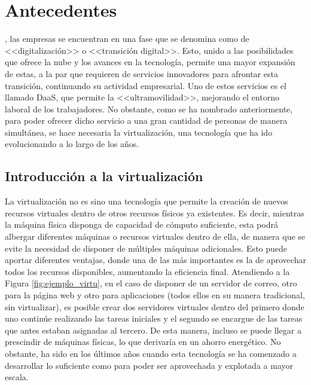 \chapter{Antecedentes}
\label{chap:antecedentes}

, las empresas se encuentran en una fase que se denomina como de <<digitalización>> o <<transición digital>>. Esto, unido a las posibilidades que ofrece la nube y los avances en la tecnología, permite una mayor expansión de estas, a la par que requieren de servicios innovadores para afrontar esta transición, continuando su actividad empresarial. Uno de estos servicios es el llamado \acf{DaaS}, que permite la <<ultramovilidad>>, mejorando el entorno laboral de los trabajadores. No obstante, como se ha nombrado anteriormente, para poder ofrecer dicho servicio a una gran cantidad de personas de manera simultánea, se hace necesaria la virtualización, una tecnología que ha ido evolucionando a lo largo de los años.


\section{Introducción a la virtualización}
La virtualización no es sino una tecnología que permite la creación de nuevos recursos virtuales dentro de otros recursos físicos ya existentes. Es decir, mientras la máquina física disponga de capacidad de cómputo suficiente, esta podrá albergar diferentes máquinas o recursos virtuales dentro de ella, de manera que se evite la necesidad de disponer de múltiples máquinas adicionales. Esto puede aportar diferentes ventajas, donde una de las más importantes es la de aprovechar todos los recursos disponibles, aumentando la eficiencia final. Atendiendo a la Figura \ref{fig:ejemplo_virtu}, en el caso de disponer de un servidor de correo, otro para la página web y otro para aplicaciones (todos ellos en su manera tradicional, sin virtualizar), es posible crear dos servidores virtuales dentro del primero donde uno continúe realizando las tareas iniciales y el segundo se encargue de las tareas que antes estaban asignadas al tercero. De esta manera, incluso se puede llegar a prescindir de máquinas físicas, lo que derivaría en un ahorro energético. No obstante, ha sido en los últimos años cuando esta tecnología se ha comenzado a desarrollar lo suficiente como para poder ser aprovechada y explotada a mayor escala.

\clearpage

